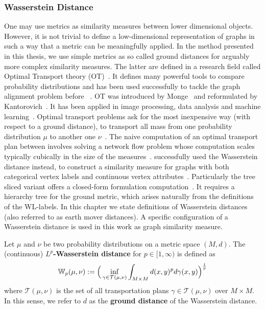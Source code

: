 	\subsubsection{Wasserstein Distance} \label{subsec:def_WassDist}		
		One may use metrics as similarity measures between lower dimensional objects.
		However, it is not trivial to define a low-dimensional representation of graphs in such a way that a metric can be meaningfully applied.		
		In the method presented in this thesis, we use simple metrics as so called ground distances for arguably more complex similarity measures.
		The latter are defined in a research field called Optimal Transport theory (OT)~\cite{2019_Maretic_CONF}.
		It defines many powerful tools to compare probability distributions and has been used successfully to tackle the graph alignment problem before ~\cite{2019_Xu_CONF, 2019_Le_NIPS}.
		OT was introduced by Monge~\cite{1781_Monge_CITATION} and reformulated by Kantorovich~\cite{1942_Kantorovich_CITATION}.
		It has been applied in image processing, data analysis and machine learning~\cite{2019_Peyre}.
		Optimal transport problems ask for the most inexpensive way (with respect to a ground distance), to transport all mass from one probability distribution $\mu$ to another one $\nu$~\cite{2009_Villani_BOOK}. 
		The naive computation of an optimal transport plan between involves solving a network flow problem whose computation scales typically cubically in the size of the measures~\cite{1999_Burkard_CONF}.
		\citeauthor{2019_Togninalli_NIPS} successfully used the Wasserstein distance instead, to construct a similarity measure for graphs with both categorical vertex labels and continuous vertex attributes~\cite{2019_Togninalli_NIPS}.
		Particularly the tree sliced variant offers a closed-form formulation computation~\cite{2019_Le_NIPS}.
		It requires a hierarchy tree for the ground metric, which arises naturally from the definitions of the WL-labels.
		In this chapter we state definitions of Wasserstein distances (also referred to as earth mover distances).
		A specific configuration of a Wasserstein distance is used in this work as graph similarity measure.
		
		Let $\mu$ and $\nu$ be two probability distributions on a metric space $(M, d)$.
		The (continuous) $L^p$\textbf{-Wasserstein distance} for $p\in [1,\infty)$ is defined as
		\[ \mathbb{W}_p(\mu, \nu):=\Big( \inf\limits_{\gamma\in\mathcal{T}(\mu, \nu)}  \int_{M\times M}d(x,y)^p d\gamma(x,y) \Big)^{\frac{1}{p}} \]
		where $\mathcal{T}(\mu, \nu)$ is the set of all transportation plans $\gamma\in\mathcal{T}(\mu, \nu)$ over $M\times M$.
		In this sense, we refer to $d$ as the \textbf{ground distance} of the Wasserstein distance.
		
